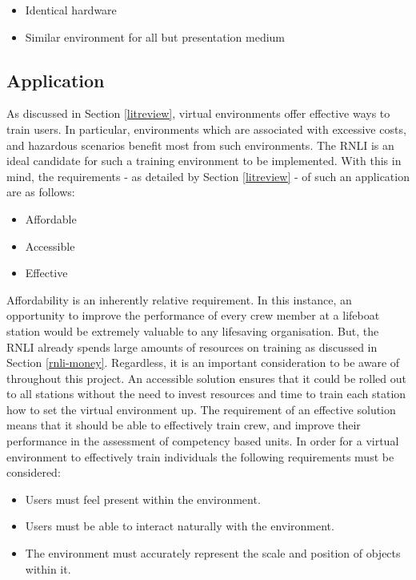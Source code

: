 \documentclass[ %
                    author={Elis Jones},
                supervisor={Dr. Kirsten Cater},
                    degree={BSc},
                     title={The Effect of Presentation Medium on Spatial Cognition},
                  subtitle={in the Virtual Environment},
                      year={2018} ]{dissertation}
\begin{document}
\begin{itemize}
    \item Identical hardware
    \item Similar environment for all but presentation medium
\end{itemize}

\subsection{Application}
As discussed in Section \ref{litreview}, virtual environments offer effective ways to train users. In particular, environments which are associated with excessive costs, and hazardous scenarios benefit most from such environments. The RNLI is an ideal candidate for such a training environment to be implemented. With this in mind, the requirements - as detailed by Section \ref{litreview} - of such an application are as follows:

\begin{itemize}
    \item Affordable
    \item Accessible
    \item Effective
\end{itemize}

Affordability is an inherently relative requirement. In this instance, an opportunity to improve the performance of every crew member at a lifeboat station would be extremely valuable to any lifesaving organisation. But, the RNLI already spends large amounts of resources on training as discussed in Section \ref{rnli-money}. Regardless, it is an important consideration to be aware of throughout this project. An accessible solution ensures that it could be rolled out to all stations without the need to invest resources and time to train each station how to set the virtual environment up. The requirement of an effective solution means that it should be able to effectively train crew, and improve their performance in the assessment of competency based units. In order for a virtual environment to effectively train individuals the following requirements must be considered:

\begin{itemize}
    \item Users must feel present within the environment.
    \item Users must be able to interact naturally with the environment.
    \item The environment must accurately represent the scale and position of objects within it.
\end{itemize}
\end{document}
